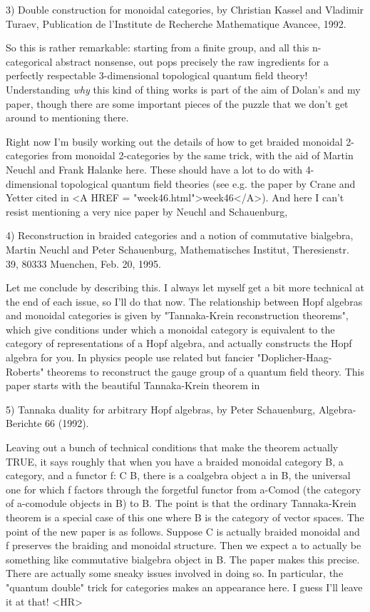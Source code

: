 3) Double construction for monoidal categories, by Christian Kassel and
Vladimir Turaev, Publication de l'Institute de Recherche Mathematique
Avancee, 1992.

So this is rather remarkable: starting from a finite group, and
all this n-categorical abstract nonsense, out pops precisely the raw
ingredients for a perfectly respectable 3-dimensional topological
quantum field theory!  Understanding \emph{why} this kind of thing works
is part of the aim of Dolan's and my paper, though there are some
important pieces of the puzzle that we don't get around to mentioning
there.

Right now I'm busily working out the details of how to get braided
monoidal 2-categories from monoidal 2-categories by the same trick,
with the aid of Martin Neuchl and Frank Halanke here.  These should
have a lot to do with 4-dimensional topological quantum field theories
(see e.g. the paper by Crane and Yetter cited in <A HREF = "week46.html">week46</A>).  And here I
can't resist mentioning a very nice paper by Neuchl and Schauenburg,

4) Reconstruction in braided categories and a notion of commutative
bialgebra, Martin Neuchl and Peter Schauenburg, Mathematisches
Institut, Theresienstr. 39, 80333 Muenchen, Feb. 20, 1995.

Let me conclude by describing this.  I always let myself get a bit
more technical at the end of each issue, so I'll do that now.
The relationship between Hopf algebras and monoidal categories is
given by "Tannaka-Krein reconstruction theorems", which give conditions under
which a monoidal category is equivalent to the category of representations
of a Hopf algebra, and actually constructs the Hopf algebra for you.
In physics people use related but fancier "Doplicher-Haag-Roberts"
theorems to reconstruct the gauge group of a quantum field theory.
This paper starts with the beautiful Tannaka-Krein theorem in

5) Tannaka duality for arbitrary Hopf algebras, by Peter Schauenburg,
Algebra-Berichte 66 (1992).

Leaving out a bunch of technical conditions that make the theorem
actually TRUE, it says roughly that when you have a braided monoidal
category B, a category, and a functor f: C \to  B, there is a coalgebra
object a in B, the universal one for which f factors through the forgetful
functor from a-Comod (the category of a-comodule objects in B) to B.
The point is that the ordinary Tannaka-Krein theorem is a special
case of this one where B is the category of vector spaces.  The point
of the new paper is as follows.  Suppose C is actually braided monoidal and
f preserves the braiding and monoidal structure.  Then we expect a to 
actually be something like commutative bialgebra object in B.  The
paper makes this precise.  There are actually some sneaky issues involved
in doing so.  In particular, the "quantum double" trick for categories
makes an appearance here.  I guess I'll leave it at that!
<HR>



